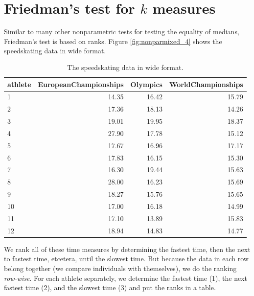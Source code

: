 \documentclass[]{report}\usepackage[]{graphicx}\usepackage[]{color}
\begin{document}
\section{Friedman's test for $k$ measures}


Similar to many other nonparametric tests for testing the equality of medians, Friedman's test is based on ranks. Figure \ref{fig:nonparmixed_4} shows the speedskating data in wide format.


\begin{table}[ht]
\centering
\caption{The speedskating data in wide format.} 
\label{tab:nonparmixed_4}
\begin{tabular}{lrrr}
  \hline
athlete & EuropeanChampionships & Olympics & WorldChampionships \\ 
  \hline
1 & 14.35 & 16.42 & 15.79 \\ 
  2 & 17.36 & 18.13 & 14.26 \\ 
  3 & 19.01 & 19.95 & 18.37 \\ 
  4 & 27.90 & 17.78 & 15.12 \\ 
  5 & 17.67 & 16.96 & 17.17 \\ 
  6 & 17.83 & 16.15 & 15.30 \\ 
  7 & 16.30 & 19.44 & 15.63 \\ 
  8 & 28.00 & 16.23 & 15.69 \\ 
  9 & 18.27 & 15.76 & 15.65 \\ 
  10 & 17.00 & 16.18 & 14.99 \\ 
  11 & 17.10 & 13.89 & 15.83 \\ 
  12 & 18.94 & 14.83 & 14.77 \\ 
   \hline
\end{tabular}
\end{table}


We rank all of these time measures by determining the fastest time, then the next to fastest time, etcetera, until the slowest time. But because the data in each row belong together (we compare individuals with themselves), we do the ranking \textit{row-wise}. For each athlete separately, we determine the fastest time (1), the next fastest time (2), and the slowest time (3) and put the ranks in a table.
\end{document}

